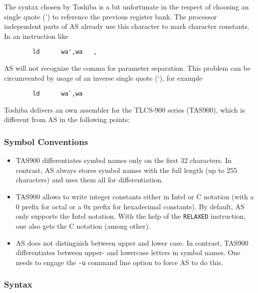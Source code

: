 \documentclass[12pt,twoside]{report}
\newcommand{\tty}[1]{{\tt #1}}
\newcommand{\asname}{{AS}}
\begin{document}
The syntax chosen by Toshiba is a bit unfortunate in the respect of
choosing an single quote (') to reference the previous register bank.  The
processor independent parts of \asname{} already use this character to mark
character constants.  In an instruction like
\begin{verbatim}
        ld      wa',wa   ,
\end{verbatim}
\asname{} will not recognize the comma for parameter separation.  This
problem can be circumvented by usage of an inverse single quote (`), for
example
\begin{verbatim}
        ld      wa`,wa
\end{verbatim}
Toshiba delivers an own assembler for the TLCS-900 series (TAS900),
which is different from \asname{} in the following points:

\subsubsection{Symbol Conventions}

\begin{itemize}
\item{TAS900 differentiates symbol names only on the first 32
      characters.  In contrast, \asname{} always stores symbol names with the
      full length (up to 255 characters) and uses them all for
      differentiation.}
\item{TAS900 allows to write integer constants either in Intel or C
      notation (with a 0 prefix for octal or a 0x prefix for hexadecimal
      constants).  By default, \asname{} only supports the Intel notation.
      With the help of the \tty{RELAXED} instruction, one also gets the C
      notation (among other).}
\item{\asname{} does not distinguish between upper and lower case.  In
      contrast, TAS900 differentiates between upper- and lowercase
      letters in symbol names.  One needs to engage the \tty{-u} command
      line option to force \asname{} to do this.}
\end{itemize}

\subsubsection{Syntax}
\end{document}
